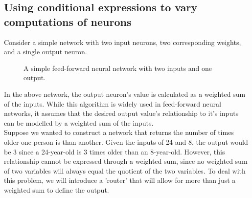 \documentclass{article}
\begin{document}
\subsection{Using conditional expressions to vary computations of neurons}

Consider a simple network with two input neurons, two corresponding weights, and a single output neuron.

\begin{figure}[!htb]

\centering
{}

\caption{A simple feed-forward neural network with two inputs and one output.}

\end{figure}

\newpage

In the above network, the output neuron's value is calculated as a weighted sum of the inputs. While this algorithm is widely used in feed-forward neural networks, it assumes that the desired output value's relationship to it's inputs can be modelled by a weighted sum of the inputs.  \\

Suppose we wanted to construct a network that returns the number of times older one person is than another. Given the inputs of 24 and 8, the output would be 3 since a 24-year-old is 3 times older than an 8-year-old. However, this relationship cannot be expressed through a weighted sum, since no weighted sum of two variables will always equal the quotient of the two variables. To deal with this problem, we will introduce a 'router' that will allow for more than just a weighted sum to define the output.
\end{document}
